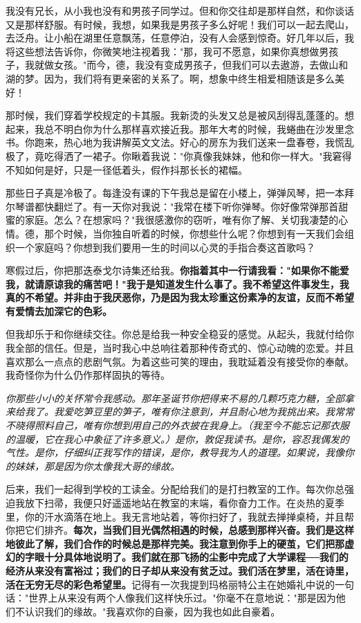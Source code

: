 \documentclass[UTF8,a4paper,8pt]{ctexart}
\begin{document}
 我没有兄长，从小我也没有和男孩子同学过。但和你交往却是那样自然，和你谈话又是那样舒服。有时候，我想，如果我是男孩子多么好呢！我们可以一起去爬山，去泛舟。让小船在湖里任意飘荡，任意停泊，没有人会感到惊奇。好几年以后，我将这些想法告诉你，你微笑地注视着我："那，我可不愿意，如果你真想做男孩子，我就做女孩。"而今，德，我没有变成男孩子，但我们可以去遨游，去做山和湖的梦。因为，我们将有更亲密的关系了。啊，想象中终生相爱相随该是多么美好！
 
 那时候，我们穿着学校规定的卡其服。我新烫的头发又总是被风刮得乱蓬蓬的。想起来，我总不明白你为什么那样喜欢接近我。那年大考的时候，我蜷曲在沙发里念书。你跑来，热心地为我讲解英文文法。好心的房东为我们送来一盘春卷，我慌乱极了，竟吃得洒了一裙子。你瞅着我说："你真像我妹妹，他和你一样大。"我窘得不知如何是好，只是一径低着头，假作抖那长长的裙幅。
 
 那些日子真是冷极了。每逢没有课的下午我总是留在小楼上，弹弹风琴，把一本拜尔琴谱都快翻烂了。有一天你对我说："我常在楼下听你弹琴。你好像常弹那首甜蜜的家庭。怎么？在想家吗？"我很感激你的窃听，唯有你了解、关切我凄楚的心情。德，那个时候，当你独自听着的时候，你想些什么呢？你想到有一天我们会组织一个家庭吗？你想到我们要用一生的时间以心灵的手指合奏这首歌吗？
 
 寒假过后，你把那迭泰戈尔诗集还给我。\textbf{你指着其中一行请我看："如果你不能爱我，就请原谅我的痛苦吧！"我于是知道发生什么事了。我不希望这件事发生，我真的不希望。并非由于我厌恶你，乃是因为我太珍重这份素净的友谊，反而不希望有爱情去加深它的色彩。}
 
 但我却乐于和你继续交往。你总是给我一种安全稳妥的感觉。从起头，我就付给你我全部的信任。但是，当时我心中总响往着那种传奇式的、惊心动魄的恋爱。并且喜欢那么一点点的悲剧气氛。为着这些可笑的理由，我耽延着没有接受你的奉献。我奇怪你为什么仍作那样固执的等待。
 
 \textit{你那些小小的关怀常令我感动。那年圣诞节你把得来不易的几颗巧克力糖，全部拿来给我了。我爱吃笋豆里的笋子，唯有你注意到，并且耐心地为我挑出来。我常常不晓得照料自己，唯有你想到用自己的外衣披在我身上。（我至今不能忘记那衣服的温暖，它在我心中象征了许多意义。）是你，敦促我读书。是你，容忍我偶发的气性。是你，仔细纠正我写作的错误，是你，教导我为人的道理。如果说，我像你的妹妹，那是因为你太像我大哥的缘故。}
 
 后来，我们一起得到学校的工读金。分配给我们的是打扫教室的工作。每次你总强迫我放下扫帚，我便只好遥遥地站在教室的末端，看你奋力工作。在炎热的夏季里，你的汗水滴落在地上。我无言地站着，等你扫好了，我就去掸掸桌椅，并且帮你把它们排齐。\textbf{每次，当我们目光偶然相遇的时候，总感到那样兴奋。我们是这样地彼此了解，我们合作的时候总是那样完美。我注意到你手上的硬茧，它们把那虚幻的字眼十分具体地说明了。我们就在那飞扬的尘影中完成了大学课程──我们的经济从来没有富裕过；我们的日子却从来没有贫乏过。我们活在梦里，活在诗里，活在无穷无尽的彩色希望里。}记得有一次我提到玛格丽特公主在她婚礼中说的一句话："世界上从来没有两个人像我们这样快乐过。"你毫不在意地说："那是因为他们不认识我们的缘故。"我喜欢你的自豪，因为我也如此自豪着。
 
\end{document}
